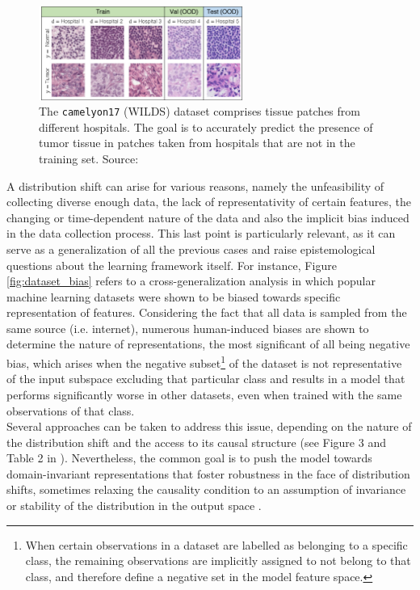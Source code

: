 \begin{figure}[H]
    \centering
    \includegraphics[width=0.6\textwidth]{img/introduction/camelyon17.png}
    \caption{The \texttt{camelyon17} (WILDS) dataset comprises tissue patches from 
    different hospitals. The goal is to accurately predict the presence of 
    tumor tissue in patches taken from hospitals that are not in the 
    training set.
    Source: \cite{kohWILDSBenchmarkIntheWild2021}
    }
    \label{fig:camelyon17}
\end{figure}

A distribution shift can arise for various reasons, namely the 
unfeasibility of collecting diverse enough data, the lack of 
representativity of certain features, the changing or time-dependent
nature of the data and also the implicit bias
induced in the data collection process. This last point
is particularly relevant, as it can serve as a generalization of all
the previous cases and raise epistemological questions
about the learning framework itself. For instance, 
Figure \ref{fig:dataset_bias} refers to a cross-generalization analysis in which popular
machine learning datasets were shown to be biased towards
specific representation of features. Considering the fact that all
data is sampled from the same source (i.e. internet), 
numerous human-induced biases are shown to determine the 
nature of representations, the most significant of all being 
negative bias, which arises when the negative subset\footnote{
    When certain observations in a dataset are labelled as belonging 
    to a specific class, the remaining observations are implicitly
    assigned to not belong to that class, and therefore define a
    negative set in the model feature space.
}
of the dataset is not representative of the input subspace 
excluding that  particular class and results in a model that performs 
significantly worse in other datasets, even when trained with 
the same observations of that class.\\

Several approaches can be taken to address this issue, depending
on the nature of the distribution shift and the access to its
causal structure (see Figure 3 and Table 2 in 
\cite{wangGeneralizingUnseenDomains2022}).
Nevertheless, the common goal is to push the model towards
domain-invariant representations that foster robustness in the
face of distribution shifts, sometimes relaxing the causality condition
to an assumption of invariance or stability of the distribution in the output space
\cite{wangGeneralizingUnseenDomains2022,liuOutOfDistributionGeneralizationSurvey2023}. \\

